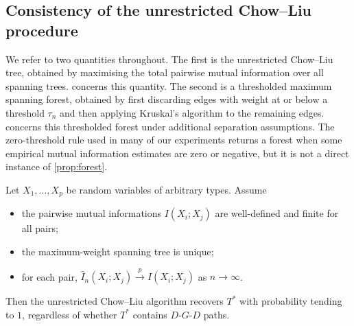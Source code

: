 \subsection{Consistency of the unrestricted Chow--Liu procedure}
\label{subsec:consistency}

We refer to two quantities throughout. The first is the unrestricted
Chow--Liu tree, obtained by maximising the total pairwise mutual
information over all spanning trees.  concerns this
quantity. The second is a thresholded maximum spanning forest,
obtained by first discarding edges with weight at or below a
threshold $\tau_n$ and then applying Kruskal's algorithm to the
remaining edges.  concerns this
thresholded forest under additional separation assumptions. The
zero-threshold rule used in many of our experiments returns a forest
when some empirical mutual information estimates are zero or
negative, but it is not a direct instance of
\cref{prop:forest}.

\begin{proposition}
\label{prop:main}
Let $X_1, \ldots, X_p$ be random variables of arbitrary types. Assume

\begin{itemize}
\item[(A1)] the pairwise mutual informations $I(X_i; X_j)$ are
well-defined and finite for all pairs;
\item[(A2)] the maximum-weight spanning tree is unique;
\item[(A3)] for each pair, $\hat{I}_n(X_i; X_j) \overset{p}{\to}
I(X_i; X_j)$ as $n \to \infty$.
\end{itemize}

Then the unrestricted Chow--Liu algorithm recovers $T^*$ with
probability tending to $1$, regardless of whether $T^*$ contains
$D$-$G$-$D$ paths.
\end{proposition}

